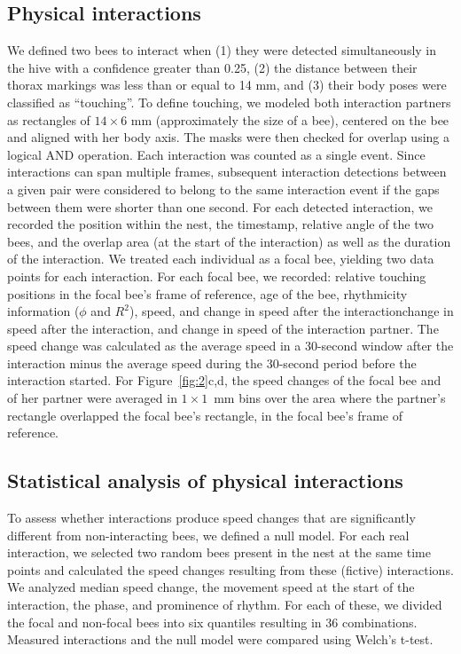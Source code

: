 \documentclass{article}
\newcommand{\added}[1]{{\color{blue}#1}}
\newcommand{\deleted}[1]{{\color{red}#1}} %
\newcommand{\replaced}[2]{\deleted{#1}\added{#2}}
\newcommand{\added}[1]{#1}
\newcommand{\deleted}[1]{}
\newcommand{\replaced}[2]{#2}
\begin{document}
\subsection*{Physical interactions}
We defined two bees to interact when (1) they were detected simultaneously in the hive with a confidence greater than 0.25, (2) the distance between their thorax markings was less than or equal to 14 mm, and (3) their body poses were classified as “touching”. To define touching, we modeled both interaction partners as rectangles of $14 \times 6$ mm (approximately the size of a bee), centered on the bee and aligned with her body axis. The masks were then checked for overlap using a logical AND operation. Each interaction was counted as a single event. Since interactions can span multiple frames, subsequent interaction detections between a given pair were considered to belong to the same interaction event if the gaps between them were shorter than one second. For each detected interaction, we recorded the position within the nest, the timestamp, relative angle of the two bees, and the overlap area (at the start of the interaction) as well as the duration of the interaction. We treated each individual as a focal bee, yielding two data points for each interaction. For each focal bee, we recorded: relative touching positions in the focal bee’s frame of reference, age of the bee, rhythmicity information ($\phi$ and $R^2$), speed, \replaced{and change in speed after the interaction}{change in speed after the interaction, and change in speed of the interaction partner}. The speed change was calculated as the average speed in a 30-second window after the interaction minus the average speed during the 30-second period before the interaction started. \added{For Figure~\ref{fig:2}c,d, the speed changes of the focal bee and of her partner were averaged in $1 \times 1$~mm bins over the area where the partner's rectangle overlapped the focal bee's rectangle, in the focal bee's frame of reference.}

\subsection*{Statistical analysis of physical interactions}
To assess whether interactions produce speed changes that are significantly different from non-interacting bees, we defined a null model. For each real interaction, we selected two random bees present in the nest at the same time points and calculated the speed changes resulting from these (fictive) interactions. We analyzed median speed change, the movement speed at the start of the interaction, the phase, and prominence of rhythm. For each of these, we divided the focal and non-focal bees into six quantiles resulting in 36 combinations. Measured interactions and the null model were compared using Welch’s t-test.
\end{document}
